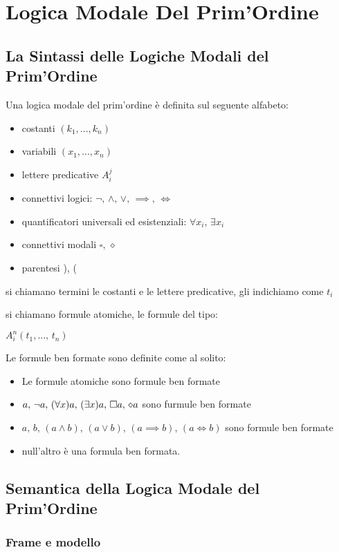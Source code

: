 
\chapter{Logica Modale Del Prim'Ordine}


\section{La Sintassi delle Logiche Modali del Prim'Ordine}

Una logica modale del prim'ordine è definita sul seguente alfabeto:
\begin{itemize}
\item costanti $(k_{1},...,k_{n})$
\item variabili $(x_{1},...,x_{n})$
\item lettere predicative $A_{i}^{j}$
\item connettivi logici: $\neg,\,\wedge,\,\vee,\,\implies,\,\iff$
\item quantificatori universali ed esistenziali: $\forall x_{i},\,\exists x_{i}$
\item connettivi modali $\square,\,\diamond$
\item parentesi ), (
\end{itemize}
si chiamano termini le costanti e le lettere predicative, gli indichiamo
come $t_{i}$

si chiamano formule atomiche, le formule del tipo:

$A_{i}^{n}(t_{1},...,\, t_{n})$

Le formule ben formate sono definite come al solito:
\begin{itemize}
\item Le formule atomiche sono formule ben formate
\item $a,\,\neg a,\,(\forall x)a,\,(\exists x)a,\,\square a,\,\diamond a$ sono furmule
ben formate
\item $a,\, b,\,(a\wedge b),\,(a\vee b),\,(a\implies b),\,(a\iff b)$ sono
formule ben formate
\item null'altro è una formula ben formata.
\end{itemize}

\section{Semantica della Logica Modale del Prim'Ordine}


\subsection{Frame e modello}

